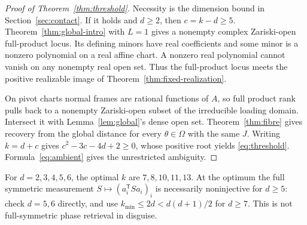 \begin{proof}[Proof of Theorem~\ref{thm:threshold}]
Necessity is the dimension bound in Section~\ref{sec:contact}. If it holds and $d\ge2$, then $c=k-d\ge5$. Theorem~\ref{thm:global-intro} with $L=1$ gives a nonempty complex Zariski-open full-product locus. Its defining minors have real coefficients and some minor is a nonzero polynomial on a real affine chart. A nonzero real polynomial cannot vanish on any nonempty real open set. Thus the full-product locus meets the positive realizable image of Theorem~\ref{thm:fixed-realization}.

On pivot charts normal frames are rational functions of $A$, so full product rank pulls back to a nonempty Zariski-open subset of the irreducible loading domain. Intersect it with Lemma~\ref{lem:global}'s dense open set. Theorem~\ref{thm:fibre} gives recovery from the global distance for every $\theta\in\Omega$ with the same $J$. Writing $k=d+c$ gives $c^2-3c-4d+2\ge0$, whose positive root yields \eqref{eq:threshold}. Formula~\eqref{eq:ambient} gives the unrestricted ambiguity.
\end{proof}
For $d=2,3,4,5,6$, the optimal $k$ are $7,8,10,11,13$. At the optimum the full symmetric measurement $S\mapsto(a_i^{\mathsf T}Sa_i)_i$ is necessarily noninjective for $d\ge5$: check $d=5,6$ directly, and use $k_{\min}\le2d<d(d+1)/2$ for $d\ge7$. This is not full-symmetric phase retrieval in disguise.

